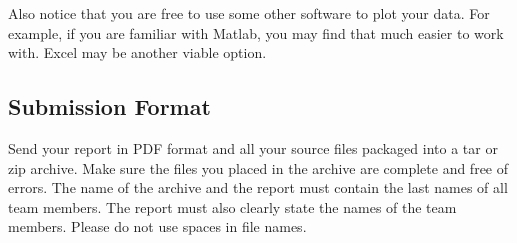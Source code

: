 \documentclass[a4paper,10pt]{article}
\begin{document}
Also notice that you are free to use some other software to plot your data.
For example, if you are familiar with Matlab, you may find that much easier to work with.
Excel may be another viable option.



\subsection*{Submission Format}

Send your report in PDF format and all your source files packaged into a tar or zip archive.
Make sure the files you placed in the archive are complete and free of errors.
The name of the archive and the report must contain the last names of all team members.
The report must also clearly state the names of the team members.
Please do not use spaces in file names.



\footnotesize


\end{document}
